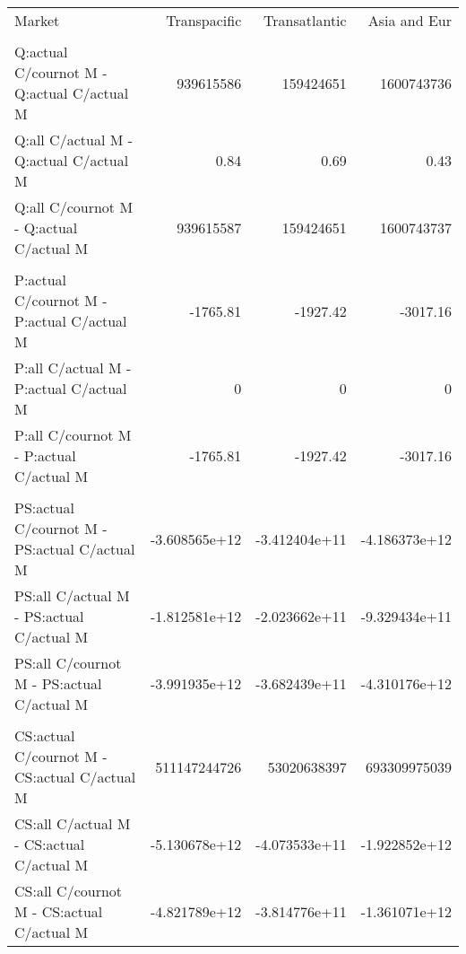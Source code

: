 
\begin{tabular}[t]{lrrr}
\toprule
Market & Transpacific & Transatlantic & Asia and Eur\\
\addlinespace[0.3em]
\multicolumn{4}{l}{\textbf{Quantity (mil TEU)}}\\
\hspace{1em}Q:actual C/cournot M - Q:actual C/actual M & 939615586 & 159424651 & 1600743736\\
\hspace{1em}Q:all C/actual M - Q:actual C/actual M & 0.84 & 0.69 & 0.43\\
\hspace{1em}Q:all C/cournot M - Q:actual C/actual M & 939615587 & 159424651 & 1600743737\\
\addlinespace[0.3em]
\multicolumn{4}{l}{\textbf{Price (\$ per TEU)}}\\
\hspace{1em}P:actual C/cournot M - P:actual C/actual M & -1765.81 & -1927.42 & -3017.16\\
\hspace{1em}P:all C/actual M - P:actual C/actual M & 0 & 0 & 0\\
\hspace{1em}P:all C/cournot M - P:actual C/actual M & -1765.81 & -1927.42 & -3017.16\\
\addlinespace[0.3em]
\multicolumn{4}{l}{\textbf{Producer Surplus (mil \$)}}\\
\hspace{1em}PS:actual C/cournot M - PS:actual C/actual M & -3.608565e+12 & -3.412404e+11 & -4.186373e+12\\
\hspace{1em}PS:all C/actual M - PS:actual C/actual M & -1.812581e+12 & -2.023662e+11 & -9.329434e+11\\
\hspace{1em}PS:all C/cournot M - PS:actual C/actual M & -3.991935e+12 & -3.682439e+11 & -4.310176e+12\\
\addlinespace[0.3em]
\multicolumn{4}{l}{\textbf{Consumer Surplus (mil \$)}}\\
\hspace{1em}CS:actual C/cournot M - CS:actual C/actual M & 511147244726 & 53020638397 & 693309975039\\
\hspace{1em}CS:all C/actual M - CS:actual C/actual M & -5.130678e+12 & -4.073533e+11 & -1.922852e+12\\
\hspace{1em}CS:all C/cournot M - CS:actual C/actual M & -4.821789e+12 & -3.814776e+11 & -1.361071e+12\\
\bottomrule
\end{tabular}
